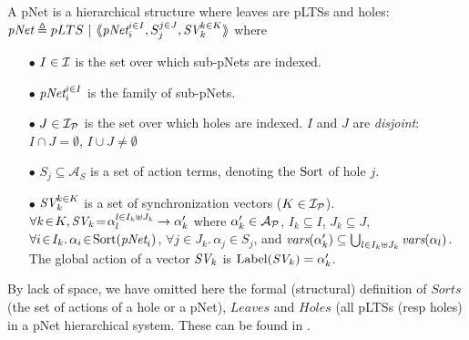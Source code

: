 \documentclass{lncs/llncs}
\def\AlgAS{\mathcal{A}_S}
\begin{document}
\begin{definition}[pNets]\label{def-pnets}
A pNet is a hierarchical structure where leaves are pLTSs and holes:\\
$\pNet\triangleq pLTS~|~\mylangle \pNet_i^{i\in I}, S_j^{j\in J}, \symb{SV}_k^{k\in K}\myrangle$
where
\begin{itemize}
\item[$\bullet$] $I \in \I$ is the set over which sub-pNets are indexed.
\item[$\bullet$] $\pNet_i^{i\in I}$ is the family of sub-pNets.

\item[$\bullet$] $J\in\I_\P$ is the set over which holes are indexed.
$I$ and $J$ are \emph{disjoint}: $I\cap J=\emptyset$,  $I\cup J\neq\emptyset$
\item[$\bullet$] $S_j \subseteq \AlgAS$ is a set of action terms, denoting the $\Sort$ of
hole $j$.

\item[$\bullet$] $\symb{SV}_k^{k\in K}$ is a set of
  synchronization vectors ($K\in\I_\P$). $\forall k\!\in\! K,
  \symb{SV}_k\!=\!\alpha_{l}^{l\in I_k \uplus J_k}\to\alpha'_k$ where
  $\alpha'_k\in \mathcal{A}_\P$, $I_k\subseteq I$, $J_k\subseteq J$,
  $\forall i\!\in\!
  I_k.\,\alpha_{i}\!\in\!\Sort(\pNet_i)$,  $\forall j\!\in\!
  J_k.\,\alpha_{j}\!\in\!S_j$, and $\vars(\alpha'_k)\subseteq \bigcup_{l\in I_k\uplus 
  J_k}{\vars({\alpha_l})}$. The global action of a vector $\symb{SV}_k$ is
$\Label(\symb{SV}_k) = \alpha'_k$.


\end{itemize}
\end{definition}

By lack of space, we have omitted here the formal (structural)
definition of $Sorts$ (the 
set of actions of a hole or a pNet), $Leaves$ and $Holes$ (all pLTSs
(resp holes) in a pNet hierarchical system. These can be found in \cite{henrio:Forte2016}.
\end{document}
